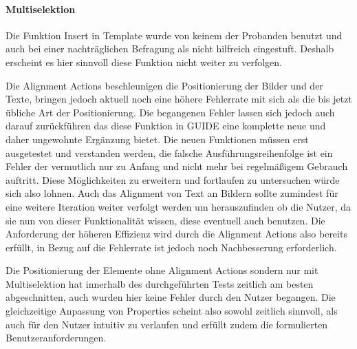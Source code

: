 \paragraph{Multiselektion}
Die Funktion  \glqq Insert in Template\grqq{} wurde von keinem der Probanden benutzt und auch bei einer nachträglichen Befragung als nicht hilfreich eingestuft. 
Deshalb erscheint es hier sinnvoll diese Funktion nicht weiter zu verfolgen.

Die Alignment Actions beschleunigen die Positionierung der Bilder und der Texte, bringen jedoch aktuell noch eine höhere Fehlerrate mit sich als die bis jetzt übliche Art der Positionierung.
Die begangenen Fehler lassen sich jedoch auch darauf zurückführen das diese Funktion in GUIDE eine komplette neue und daher ungewohnte Ergänzung bietet.
Die neuen Funktionen müssen erst ausgetestet und verstanden werden, die falsche Ausführungsreihenfolge ist ein Fehler der vermutlich nur zu Anfang und nicht mehr bei regelmäßigem Gebrauch auftritt.
Diese Möglichkeiten zu erweitern und fortlaufen zu untersuchen  würde sich also lohnen.
Auch das Alignment von Text an Bildern sollte zumindest für eine weitere Iteration weiter verfolgt werden um herauszufinden ob die Nutzer, da sie nun von dieser Funktionalität wissen, diese eventuell auch benutzen.
Die Anforderung der höheren Effizienz wird durch die Alignment Actions also bereits erfüllt, in Bezug auf die Fehlerrate ist jedoch noch Nachbesserung erforderlich.

Die Positionierung der Elemente ohne Alignment Actions sondern nur mit Multiselektion hat innerhalb des durchgeführten Tests zeitlich am besten abgeschnitten, auch wurden hier keine Fehler durch den Nutzer begangen.
Die gleichzeitige Anpassung von Properties scheint also sowohl zeitlich sinnvoll, als auch für den Nutzer intuitiv zu verlaufen und erfüllt zudem die formulierten Benutzeranforderungen.

